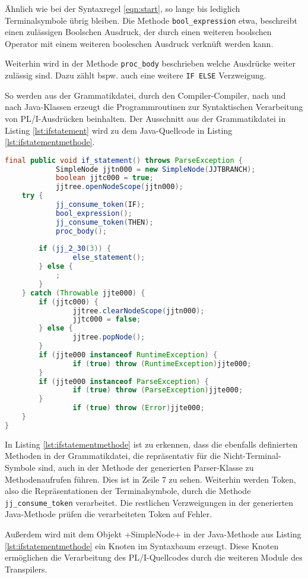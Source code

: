 Ähnlich wie bei der Syntaxregel \ref{eqn:start}, so lange bis lediglich Terminalsymbole übrig bleiben.
Die Methode \verb+bool_expression+ etwa, beschreibt einen zulässigen Boolschen Ausdruck, der durch einen weiteren boolschen Operator mit einem weiteren booleschen Ausdruck verknüft werden kann.

Weiterhin wird in der Methode \verb+proc_body+ beschrieben welche Ausdrücke weiter zulässig sind. Dazu zählt bspw. auch eine weitere \verb+IF ELSE+ Verzweigung. 

 So werden aus der Grammatikdatei, durch den Compiler-Compiler, nach und nach Java-Klassen erzeugt die Programmroutinen zur Syntaktischen Verarbeitung von PL/I-Ausdrücken beinhalten.
Der Ausschnitt aus der Grammatikdatei in Listing \ref{lst:ifstatement} wird zu dem Java-Quellcode in Listing \ref{lst:ifstatementmethode}.


\begin{lstlisting}[language=Java, caption=Verkürzte If-Statement Methode aus dem Parser, label={lst:ifstatementmethode}]
 final public void if_statement() throws ParseException {
			SimpleNode jjtn000 = new SimpleNode(JJTBRANCH);
			boolean jjtc000 = true;
			jjtree.openNodeScope(jjtn000);
	try {
			jj_consume_token(IF);
			bool_expression();
			jj_consume_token(THEN);
			proc_body();
		
		if (jj_2_30(3)) {
				else_statement();
		} else {
			;
		}
	} catch (Throwable jjte000) {
		if (jjtc000) {
				jjtree.clearNodeScope(jjtn000);
				jjtc000 = false;
		} else {
				jjtree.popNode();
		}
		if (jjte000 instanceof RuntimeException) {
				if (true) throw (RuntimeException)jjte000;
		}
		if (jjte000 instanceof ParseException) {
				if (true) throw (ParseException)jjte000;
		}
				if (true) throw (Error)jjte000;
	}
}	
\end{lstlisting}

In Listing \ref{lst:ifstatementmethode} ist zu erkennen, dass die ebenfalls definierten Methoden in der Grammatikdatei, die repräsentativ für die Nicht-Terminal-Symbole sind, auch in der Methode der generierten Parser-Klasse zu Methodenaufrufen führen. Dies ist in Zeile 7 zu sehen. Weiterhin werden Token, also die Repräsentationen der Terminalsymbole, durch die Methode \verb+jj_consume_token+ verarbeitet. Die restlichen Verzweigungen in der generierten Java-Methode prüfen die verarbeiteten Token auf Fehler.

Außerdem wird mit dem Objekt \ver+SimpleNode+ in der Java-Methode aus Listing \ref{lst:ifstatementmethode} ein Knoten im Syntaxbaum erzeugt. Diese Knoten ermöglichen die Verarbeitung des PL/I-Quellcodes durch die weiteren Module des Transpilers.


